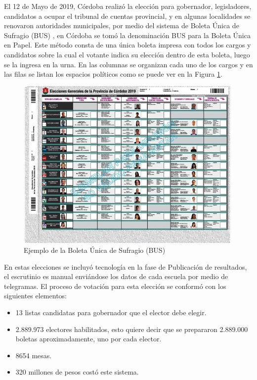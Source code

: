El 12 de Mayo de 2019, Córdoba realizó la elección para gobernador, legisladores,  candidatos a ocupar el tribunal de cuentas provincial, y en algunas localidades se renovaron autoridades municipales, por medio del sistema de Boleta Única de Sufragio (BUS) \cite{cortiboleta}, en Córdoba se tomó la denominación BUS para la Boleta Única en Papel. Este método consta de una única boleta impresa con todos los cargos y candidatos 
sobre la cual el votante indica su elección dentro de esta boleta, luego 
se la ingresa en la urna. En las columnas se organizan cada uno de los cargos y en las filas se listan los espacios políticos como se puede ver en la Figura \ref{graf:BUSCordoba}.
\begin{figure}[h!]
  \includegraphics[width=1\textwidth]{img/boletaunica-cordoba.jpg}
  \caption{Ejemplo de la Boleta Única de Sufragio (BUS)}
  \label{graf:BUSCordoba}
\end{figure}
En estas elecciones se incluyó tecnología en la fase de Publicación de resultados, el escrutinio es manual enviándose los datos de cada escuela por medio de telegramas. El proceso de votación para esta elección se conformó con los siguientes elementos: 
\begin{itemize}
    \item 13 listas candidatas para gobernador que el elector debe elegir.
    \item 2.889.973 electores habilitados, esto quiere decir que se prepararon 2.889.000 boletas aproximadamente, uno por cada elector.
    \item 8654 mesas.
    \item 320 millones de pesos costó este sistema. 
\end{itemize}
